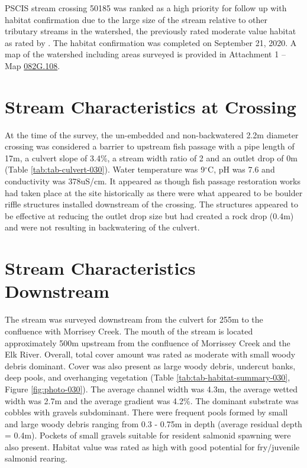 \documentclass[
]{book}
\begin{document}
PSCIS stream crossing 50185 was ranked as a high priority for follow up with habitat confirmation due to the large size of the stream relative to other tributary streams in the watershed, the previously rated moderate value habitat as rated by \citet{vastFishPassage2013}. The habitat confirmation was completed on September 21, 2020. A map of the watershed including areas surveyed is provided in Attachment 1 -- Map \href{https://hillcrestgeo.ca/outgoing/fishpassage/projects/elk/FishPassage_082G.108.pdf}{082G.108}.

\hypertarget{stream-characteristics-at-crossing-2}{%
\section*{Stream Characteristics at Crossing}\label{stream-characteristics-at-crossing-2}}

At the time of the survey, the un-embedded and non-backwatered 2.2m diameter crossing was considered a barrier to upstream fish passage with a pipe length of 17m, a culvert slope of 3.4\%, a stream width ratio of 2 and an outlet drop of 0m (Table \ref{tab:tab-culvert-030}). Water temperature was 9\(^\circ\)C, pH was 7.6 and conductivity was 378uS/cm. It appeared as though fish passage restoration works had taken place at the site historically as there were what appeared to be boulder riffle structures installed downstream of the crossing. The structures appeared to be effective at reducing the outlet drop size but had created a rock drop (0.4m) and were not resulting in backwatering of the culvert.

\hypertarget{stream-characteristics-downstream-2}{%
\section*{Stream Characteristics Downstream}\label{stream-characteristics-downstream-2}}

The stream was surveyed downstream from the culvert for 255m to the confluence with Morrisey Creek. The mouth of the stream is located approximately 500m upstream from the confluence of Morrissey Creek and the Elk River. Overall, total cover amount was rated as moderate with small woody debris dominant. Cover was also present as large woody debris, undercut banks, deep pools, and overhanging vegetation (Table \ref{tab:tab-habitat-summary-030}, Figure \ref{fig:photo-030}). The average channel width was 4.3m, the average wetted width was 2.7m and the average gradient was 4.2\%. The dominant substrate was cobbles with gravels subdominant. There were frequent pools formed by small and large woody debris ranging from 0.3 - 0.75m in depth (average residual depth = 0.4m). Pockets of small gravels suitable for resident salmonid spawning were also present. Habitat value was rated as high with good potential for fry/juvenile salmonid rearing.
\end{document}

